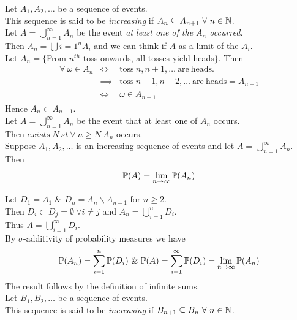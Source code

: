 \documentclass[11pt,a4paper]{article}
\begin{document}
Let $A_1,A_2,\dots$ be a sequence of events.\\
This sequence is said to be \textit{increasing} if $A_n\subseteq A_{n+1}\ \forall\ n\in\nats$.\\

Let $A=\bigcup\limits_{n=1}^\infty A_n$ be the event \textit{at least one of the $A_n$ occurred}.\\
Then $A_n=\bigcup\limits{i=1}^nA_i$ and we can think if $A$ as a limit of the $A_i$.\\

Let $A_n=\{$From $n^{th}$ toss onwards, all tosses yield heads$\}$. Then
\[\begin{array}{rcl}
\forall\ \omega\in A_n&\Leftrightarrow&\mathrm{toss\ }n,n+1,\dots\ \mathrm{are\ heads}.\\
&\implies&\mathrm{toss\ } n+1, n+2, \dots\ \mathrm{are\ heads}=A_{n+1}\\
&\Leftrightarrow&\omega\in A_{n+1}
\end{array}\]
Hence $A_n\subset A_{n+1}$.\\
Let $A=\bigcup\limits_{n=1}^\infty A_n$ be the event that at least one of $A_n$ occurs.\\
Then $exists\ N\ st\ \forall\ n\geq N\ A_n$ occurs.\\

Suppose $A_1,A_2,\dots$ is an increasing sequence of events and let $A=\bigcup\limits_{n=1}^\infty A_n$. Then
$$\mathbb{P}(A)=\lim_{n\to\infty}\mathbb{P}(A_n)$$

Let $D_1=A_1$ \& $D_n=A_n\backslash A_{n-1}$ for $n\geq 2$.\\
Then $D_i\subset D_j=\emptyset\ \forall i\neq j$ and $A_n=\bigcup\limits_{i=1}^n D_i$.\\
Thus $A=\bigcup\limits_{i=1}^\infty D_i$.\\
By $\sigma$-additivity of probability measures we have
$$\prob(A_n)=\sum_{i=1}^n\prob(D_i)\ \&\ \prob(A)=\sum_{i=1}^\infty\prob(D_i)=\lim_{n\to\infty}\prob(A_n)$$
The result follows by the definition of infinite sums.\\

Let $B_1,B_2,\dots$ be a sequence of events.\\
This sequence is said to be \textit{increasing} if $B_{n+1}\subseteq B_{n}\ \forall\ n\in\nats$.\\
\end{document}
